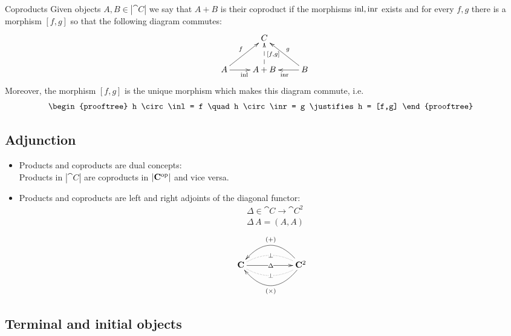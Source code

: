 \documentclass[handout]{beamer}
\newcommand{\ru}[2]{\vspace{1ex}
\begin{prooftree}
#1 \justifies #2
\end{prooftree}\vspace{1ex}}
\begin{document}
\begin{frame}
  \begin{block}{Coproducts}
  Given objects $A,B\in|\cat{C}|$ we say that $A + B$ is their coproduct
  if the morphisms $\mathrm{inl},\mathrm{inr}$ exists and for every $f,g$ there is a morphism
  $[f,g]$ so that the following diagram commutes:
  \[\xymatrix{
    & C \\
    A \ar[ur]^f \ar[r]_{\inl}& A + B \ar@{-->}[u]_{[f,g]}  & B \ar[l]^{\inr} \ar[ul]_g
  }\]
  Moreover, the morphism $[f,g]$ is the unique morphism which makes
  this diagram commute, i.e.
  \begin{align*}
    & \ru{h \circ \inl = f \quad h \circ \inr = g}
    { h = [f,g] }
   \end{align*}
  \end{block}

\end{frame}

\subsection{Adjunction}

\begin{frame}
  
  \begin{itemize}
  \item Products and coproducts are dual concepts:\\
    Products in $|\cat{C}|$ are coproducts in $|\mathbf{C}^{\mathrm{op}}|$ and vice versa.

  \item Products and coproducts are left and right adjoints of the diagonal functor:
    \begin{align*}
      & \Delta \in \cat{C} \to \cat{C}^2 \\
      & \Delta\,A = (A,A)
    \end{align*}
    \[
    \xymatrix{
      \cat{C} \ar[rr]|\Delta 
      \ar @{.} @/^1pc/[rr] |{\bot}  
      \ar @{.} @/_1pc/[rr] |{\bot}  
      && \cat{C}^2 \ar@/^2pc/[ll]^{(\times)} \ar@/_2pc/[ll]_{(+)}
      }\]
  \end{itemize}

\end{frame}

\subsection{Terminal and initial objects}
\end{document}
